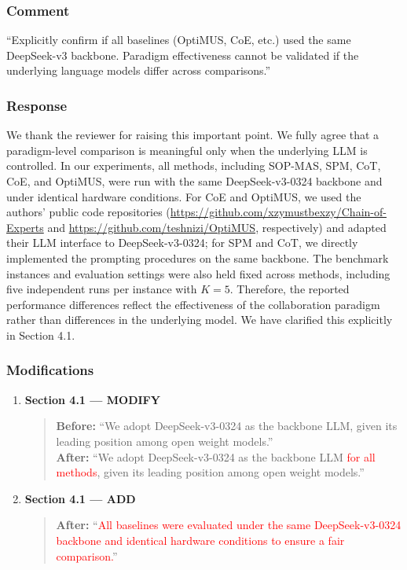 \documentclass[11pt,a4paper]{article}
\begin{document}
\subsubsection{Comment}
``Explicitly confirm if all baselines (OptiMUS, CoE, etc.) used the same DeepSeek-v3 backbone. Paradigm effectiveness cannot be validated if the underlying language models differ across comparisons.''

\subsubsection{Response}
We thank the reviewer for raising this important point. We fully agree that a paradigm-level comparison is meaningful only when the underlying LLM is controlled. In our experiments, all methods, including SOP-MAS, SPM, CoT, CoE, and OptiMUS, were run with the same DeepSeek-v3-0324 backbone and under identical hardware conditions. For CoE and OptiMUS, we used the authors' public code repositories (\url{https://github.com/xzymustbexzy/Chain-of-Experts} and \url{https://github.com/teshnizi/OptiMUS}, respectively) and adapted their LLM interface to DeepSeek-v3-0324; for SPM and CoT, we directly implemented the prompting procedures on the same backbone. The benchmark instances and evaluation settings were also held fixed across methods, including five independent runs per instance with $K=5$. Therefore, the reported performance differences reflect the effectiveness of the collaboration paradigm rather than differences in the underlying model. We have clarified this explicitly in Section 4.1.

\subsubsection{Modifications}
\begin{enumerate}
\item \textbf{Section 4.1 --- MODIFY}
\begin{quote}
\textbf{Before:} ``We adopt DeepSeek-v3-0324 as the backbone LLM, given its leading position among open weight models.''\\[4pt]
\textbf{After:} ``We adopt DeepSeek-v3-0324 as the backbone LLM \textcolor{red}{for all methods}, given its leading position among open weight models.''
\end{quote}

\item \textbf{Section 4.1 --- ADD}
\begin{quote}
\textbf{After:} ``\textcolor{red}{All baselines were evaluated under the same DeepSeek-v3-0324 backbone and identical hardware conditions to ensure a fair comparison.}''
\end{quote}
\end{enumerate}
\end{document}
